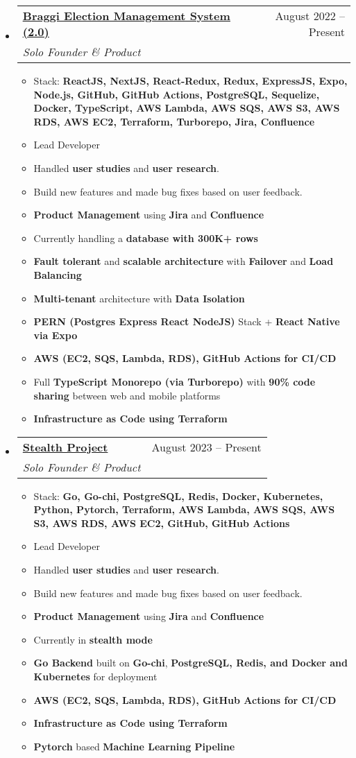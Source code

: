 \documentclass[a4paper,11pt]{article}
\makeatletter
\newcommand{\resumeItem}[1]{
  \item\large{#1}
}
\newcommand{\resumeItemListStart}{\begin{itemize}[rightmargin=0.11in]}
\newcommand{\resumeItemListEnd}{\end{itemize}}
\newcommand{\resumeQuadHeading}[4]{
  \item
  \begin{tabular*}{0.96\textwidth}[t]{l@{\extracolsep{\fill}}r}
    \textbf{#1} & #2 \\
    \textit{\large#3} & \textit{\large #4} \\
  \end{tabular*}
}
\newcommand{\resumeHeadingListStart}{
  \begin{itemize}[leftmargin=0.15in, label={}]
}
\newcommand{\resumeHeadingListEnd}{\end{itemize}}
\makeatother
\begin{document}
  \resumeHeadingListStart{}
  \resumeQuadHeading{\href{https://braggi-ems.com/}{\uline{Braggi Election Management System (2.0)}}}{August 2022 -- Present}
  {Solo Founder \& Product}{}
      \resumeItemListStart{}
		\large{Braggi Election Management System is built for those contesting in elections. It aims to help leaders better manage their party workers to ensure faster reach and acquisition of voters. After undergoing a major rewrite and taking the learnings from the success of the previous iteration, this is now capable of handling Country-wide voter data as well as multiple national parties from a single platform, while offering Machine Learning Powered Algorithms to offer Analytics.}
		\resumeItem{Stack: \textbf{ReactJS, NextJS, React-Redux, Redux, ExpressJS, Expo, Node.js, GitHub, GitHub Actions, PostgreSQL, Sequelize, Docker, TypeScript, AWS Lambda, AWS SQS, AWS S3, AWS RDS, AWS EC2, Terraform, Turborepo, Jira, Confluence}}
		\resumeItem{Lead Developer}
		\resumeItem{Handled \textbf{user studies} and \textbf{user research}.}
		\resumeItem{Build new features and made bug fixes based on user feedback.}
		\resumeItem{\textbf{Product Management} using \textbf{Jira} and \textbf{Confluence}}
		\resumeItem{Currently handling a \textbf{database with 300K+ rows}}
		\resumeItem{\textbf{Fault tolerant} and \textbf{scalable architecture} with \textbf{Failover} and \textbf{Load Balancing}}
		\resumeItem{\textbf{Multi-tenant} architecture with \textbf{Data Isolation}}
		\resumeItem{\textbf{PERN (Postgres Express React NodeJS)} Stack + \textbf{React Native via Expo}}
		\resumeItem{\textbf{AWS (EC2, SQS, Lambda, RDS), GitHub Actions for CI/CD}}
		\resumeItem{Full \textbf{TypeScript Monorepo (via Turborepo)} with \textbf{90\% code sharing} between web and mobile platforms}
		\resumeItem{\textbf{Infrastructure as Code using Terraform}}
      \resumeItemListEnd{}
  \resumeHeadingListEnd{}

  \resumeHeadingListStart{}
  \resumeQuadHeading{{\uline{Stealth Project}}}{August 2023 -- Present}
  {Solo Founder \& Product}{}
      \resumeItemListStart{}
		\large{A stealth project that I am currently working on in parallel with my other projects, It is in the Health \& Fitness domain. This is a project that I am very excited about.}
		\resumeItem{Stack: \textbf{Go,
			Go-chi,
			PostgreSQL,
			Redis,
			Docker,
			Kubernetes,
			Python,
			Pytorch,
			Terraform,
			AWS Lambda,
			AWS SQS,
			AWS S3,
			AWS RDS,
			AWS EC2,
			GitHub,
			GitHub Actions}}
		\resumeItem{Lead Developer}
		\resumeItem{Handled \textbf{user studies} and \textbf{user research}.}
		\resumeItem{Build new features and made bug fixes based on user feedback.}
		\resumeItem{\textbf{Product Management} using \textbf{Jira} and \textbf{Confluence}}
		\resumeItem{Currently in \textbf{stealth mode}}
		\resumeItem{\textbf{Go Backend} built on \textbf{Go-chi}, \textbf{PostgreSQL, Redis, and Docker and Kubernetes} for deployment}
		\resumeItem{\textbf{AWS (EC2, SQS, Lambda, RDS), GitHub Actions for CI/CD}}
		\resumeItem{\textbf{Infrastructure as Code using Terraform}}
		\resumeItem{\textbf{Pytorch} based \textbf{Machine Learning Pipeline}}
      \resumeItemListEnd{}
  \resumeHeadingListEnd{}
\end{document}
